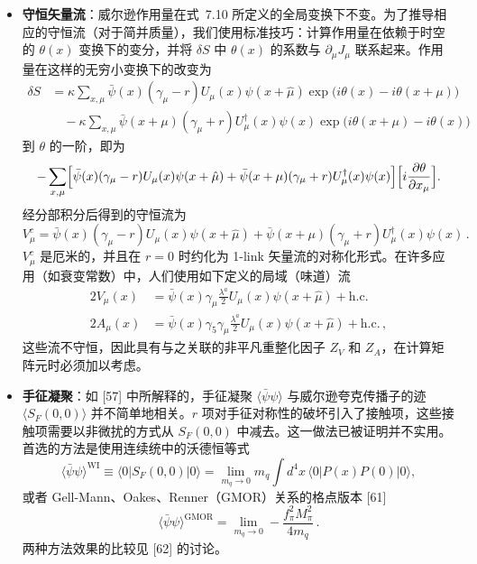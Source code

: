 \begin{itemize}
\item \textbf{守恒矢量流}：威尔逊作用量在式~7.10 所定义的全局变换下不变。为了推导相应的守恒流（对于简并质量），我们使用标准技巧：计算作用量在依赖于时空的 $\theta(x)$ 变换下的变分，并将 $\delta S$ 中 $\theta(x)$ 的系数与 $\partial_\mu J_\mu$ 联系起来。作用量在这样的无穷小变换下的改变为
\begin{align*}
\delta S &= \kappa \sum_{x,\mu} \bar\psi(x)(\gamma_\mu - r) U_\mu(x) \psi(x + \hat{\mu}) \exp\bigl( i\theta(x) - i\theta(x + \mu) \bigr) \\
&\quad - \kappa \sum_{x,\mu} \bar\psi(x + \mu)(\gamma_\mu + r) U_\mu^\dagger (x) \psi(x) \exp\bigl( i\theta(x + \mu) - i\theta(x) \bigr)
\end{align*}
到 $\theta$ 的一阶，即为
\[
-\sum_{x,\mu} \Bigl[ \bar\psi(x)(\gamma_\mu - r) U_\mu(x) \psi(x + \hat{\mu}) + \bar\psi(x + \mu)(\gamma_\mu + r) U_\mu^\dagger (x) \psi(x) \Bigr] \Bigl[ i \frac{\partial \theta}{\partial x_\mu} \Bigr] .
\]
经分部积分后得到的守恒流为
\begin{equation}
V^{c}_\mu = \bar\psi(x) (\gamma_\mu - r) U_\mu (x) \psi (x + \hat{\mu}) + \bar\psi(x + \mu)(\gamma_\mu + r) U_\mu^\dagger (x) \psi (x) \,.
\end{equation}
$V^{c}_\mu$ 是厄米的，并且在 $r = 0$ 时约化为 1-link 矢量流的对称化形式。在许多应用（如衰变常数）中，人们使用如下定义的局域（味道）流
\begin{align}
2V_\mu(x) &= \bar\psi(x) \gamma_\mu \frac{\lambda^a}{2} U_\mu (x) \psi (x + \hat{\mu}) + \mathrm{h.c.} \nonumber\\
2A_\mu(x) &= \bar\psi(x) \gamma_5\gamma_\mu \frac{\lambda^a}{2} U_\mu (x) \psi (x + \hat{\mu}) + \mathrm{h.c.} \,,
\end{align}
这些流不守恒，因此具有与之关联的非平凡重整化因子 $Z_V$ 和 $Z_A$，在计算矩阵元时必须加以考虑。

\item \textbf{手征凝聚}：如 [57] 中所解释的，手征凝聚 $\langle \bar\psi \psi \rangle$ 与威尔逊夸克传播子的迹 $\langle S_F(0,0) \rangle$ 并不简单地相关。$r$ 项对手征对称性的破坏引入了接触项，这些接触项需要以非微扰的方式从 $S_F(0,0)$ 中减去。这一做法已被证明并不实用。首选的方法是使用连续统中的沃德恒等式
\begin{equation}
\langle \bar\psi\psi \rangle^{\mathrm{WI}} \equiv \langle 0| S_F(0,0) |0\rangle = \lim_{m_q \to 0} m_q \int d^4x\, \langle 0| P(x)P(0) |0\rangle,
\end{equation}
或者 Gell-Mann、Oakes、Renner（GMOR）关系的格点版本 [61]
\begin{equation}
\langle \bar\psi\psi \rangle^{\mathrm{GMOR}} = \lim_{m_q \to 0} - \frac{f_\pi^2 M_\pi^2}{4 m_q} \,.
\end{equation}
两种方法效果的比较见 [62] 的讨论。


\end{itemize}
